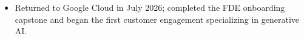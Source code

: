 \begin{itemize}
  \item Returned to Google Cloud in July 2026; completed the FDE onboarding capstone and began the first customer engagement specializing in generative AI.
\end{itemize}
